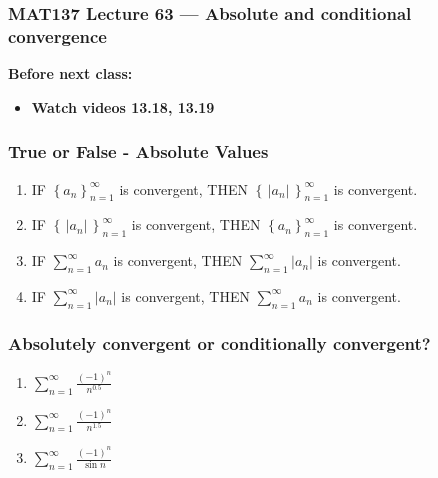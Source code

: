 \documentclass[14pt]{beamer}
\newcommand{\azul}[1]{{\color{blue} #1}}
\newcommand{\rojo}[1]{{\color{red} #1}}
\newcommand{\setsize}[1]{\fontsize{#1}{#1}\selectfont} %
\newcommand{\smallerfont}{\setsize{13}} %
\newcommand{\vv}{\vspace{.5cm}}
\newcommand{\vvv}{\vspace{.2cm}}
\begin{document}
\begin{frame}
	\frametitle{MAT137 Lecture 63 --- Absolute and conditional convergence 	}

	\vfill
	{\bf Before next class:}
		\begin{itemize} \normalsize
			\item {\bf Watch videos  13.18, 13.19 }
		\end{itemize}
\end{frame}

	\begin{frame}[t]
		\smallerfont
		\frametitle{ True or False - Absolute Values}

		\begin{enumerate}
			\item IF \azul{${\displaystyle \left\{ a_n \right\}_{n=1}^{\infty}}$} is
				convergent, \quad THEN \rojo{${\displaystyle \left\{ \, |a_n| \, \right\}_{n=1}^{\infty}}$}
				is convergent. \vv

			\item IF \rojo{${\displaystyle \left\{ \, |a_n| \, \right\}_{n=1}^{\infty}}$}
				is convergent, \quad THEN \azul{${\displaystyle \left\{ a_n \right\}_{n=1}^{\infty}}$}
				is convergent. \vv

			\item IF \; \azul{${\displaystyle \sum_{n=1}^{\infty} a_n }$} \; is
				convergent, \quad THEN \; \rojo{ ${\displaystyle \sum_{n=1}^{\infty} |a_n| }$}
				\; is convergent. \vvv

			\item IF \; \rojo{${\displaystyle \sum_{n=1}^{\infty} |a_n| }$} \; is
				convergent, \quad THEN \; \azul{${\displaystyle \sum_{n=1}^{\infty} a_n }$}
				\; is convergent.
		\end{enumerate}
	\end{frame}

	\begin{frame}[t]
		\frametitle{Absolutely convergent or conditionally convergent?}

		\begin{enumerate}
			\item ${\displaystyle \sum_{n=1}^{\infty} \frac{(-1)^{n}}{n^{0.5}}}$ \vv

			\item ${\displaystyle \sum_{n=1}^{\infty} \frac{(-1)^{n}}{n^{1.5}}}$ \vv

			\item ${\displaystyle \sum_{n=1}^{\infty} \frac{(-1)^{n}}{\sin n}}$ \vv
		\end{enumerate}
	\end{frame}
\end{document}
